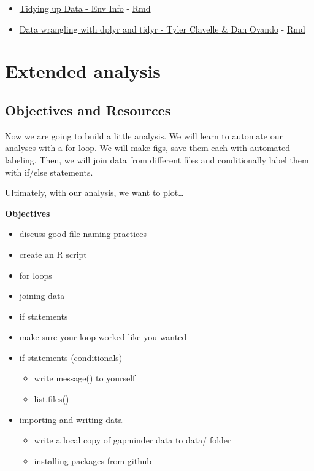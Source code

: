 \documentclass[]{book}
\providecommand{\tightlist}{%
  \setlength{\itemsep}{0pt}\setlength{\parskip}{0pt}}
\theoremstyle{definition}
\theoremstyle{definition}
\theoremstyle{definition}
\theoremstyle{remark}
\begin{document}
\begin{itemize}
\tightlist
\item
  \href{http://ucsb-bren.github.io/env-info/wk04_tidyr.html}{Tidying up
  Data - Env Info} -
  \href{https://github.com/ucsb-bren/env-info/blob/gh-pages/wk04_tidyr.Rmd}{Rmd}
\item
  \href{http://bbest.github.io/dplyr-tidyr-tutorial/}{Data wrangling
  with dplyr and tidyr - Tyler Clavelle \& Dan Ovando} -
  \href{https://github.com/bbest/dplyr-tidyr-tutorial/blob/gh-pages/index.Rmd}{Rmd}
\end{itemize}

\chapter{Extended analysis}\label{analysis}

\section{Objectives and Resources}\label{objectives-and-resources}

Now we are going to build a little analysis. We will learn to automate
our analyses with a for loop. We will make figs, save them each with
automated labeling. Then, we will join data from different files and
conditionally label them with if/else statements.

Ultimately, with our analysis, we want to plot\ldots{}

\textbf{Objectives}

\begin{itemize}
\item
  discuss good file naming practices
\item
  create an R script
\item
  for loops
\item
  joining data
\item
  if statements
\item
  make sure your loop worked like you wanted
\item
  if statements (conditionals)

  \begin{itemize}
  \tightlist
  \item
    write message() to yourself
  \item
    list.files()
  \end{itemize}
\item
  importing and writing data

  \begin{itemize}
  \tightlist
  \item
    write a local copy of gapminder data to data/ folder
  \item
    installing packages from github
  \end{itemize}
\end{itemize}
\end{document}
